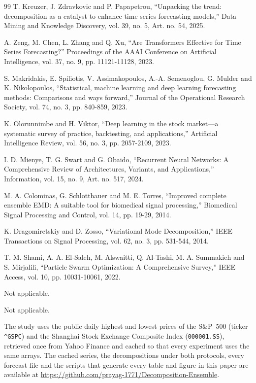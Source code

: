 \documentclass[pdflatex,sn-mathphys-num]{sn-jnl}%
\theoremstyle{thmstyleone}%
\theoremstyle{thmstyletwo}%
\theoremstyle{thmstylethree}%
\begin{document}
\begin{thebibliography}{99}
 T. Kreuzer, J. Zdravkovic and P. Papapetrou, ``Unpacking the trend: decomposition as a
catalyst to enhance time series forecasting models,'' Data Mining and Knowledge
Discovery, vol. 39, no. 5, Art. no. 54, 2025.

 A. Zeng, M. Chen, L. Zhang and Q. Xu, ``Are Transformers Effective for Time Series
Forecasting?'' Proceedings of the AAAI Conference on Artificial Intelligence, vol. 37,
no. 9, pp. 11121-11128, 2023.

 S. Makridakis, E. Spiliotis, V. Assimakopoulos, A.-A. Semenoglou, G. Mulder and K.
Nikolopoulos, ``Statistical, machine learning and deep learning forecasting methods:
Comparisons and ways forward,'' Journal of the Operational Research Society, vol. 74,
no. 3, pp. 840-859, 2023.

 K. Olorunnimbe and H. Viktor, ``Deep learning in the stock market—a systematic survey
of practice, backtesting, and applications,'' Artificial Intelligence Review, vol. 56,
no. 3, pp. 2057-2109, 2023.

 I. D. Mienye, T. G. Swart and G. Obaido, ``Recurrent Neural Networks: A Comprehensive
Review of Architectures, Variants, and Applications,'' Information, vol. 15, no. 9,
Art. no. 517, 2024.

 M. A. Colominas, G. Schlotthauer and M. E. Torres, ``Improved complete ensemble EMD: A
suitable tool for biomedical signal processing,'' Biomedical Signal Processing and
Control, vol. 14, pp. 19-29, 2014.

 K. Dragomiretskiy and D. Zosso, ``Variational Mode Decomposition,'' IEEE Transactions
on Signal Processing, vol. 62, no. 3, pp. 531-544, 2014.

 T. M. Shami, A. A. El-Saleh, M. Alswaitti, Q. Al-Tashi, M. A. Summakieh and S.
Mirjalili, ``Particle Swarm Optimization: A Comprehensive Survey,'' IEEE Access, vol.
10, pp. 10031-10061, 2022.

\end{thebibliography}

 Not applicable.

 Not applicable.

 The study uses the public daily highest and lowest prices of
the S\&P~500 (ticker \texttt{\textasciicircum GSPC}) and the Shanghai Stock Exchange
Composite Index (\texttt{000001.SS}), retrieved once from Yahoo Finance and cached so
that every experiment uses the same arrays. The cached series, the decompositions under
both protocols, every forecast file and the scripts that generate every table and figure
in this paper are available at
\url{https://github.com/prayag-1771/Decomposition-Ensemble}.
\end{document}
